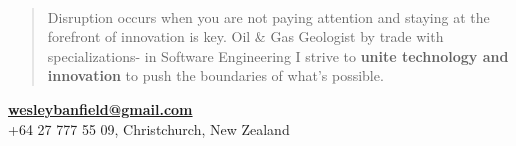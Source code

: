 \documentclass[]{friggeri-cv}
\begin{document}
~
\begin{quote}
\large
Disruption occurs when you are not paying attention and staying at the forefront of innovation is key. Oil \& Gas Geologist by trade with specializations- in Software Engineering I strive to \textbf{unite technology and innovation} to push the boundaries of what’s possible.
\end{quote}

\begin{center}
\vspace{9pt}
\href{mailto:wesleybanfield@gmail.com}{\textbf{wesleybanfield@gmail.com}}
\\+64 27 777 55 09, Christchurch, New Zealand
\end{center}
\end{document}
